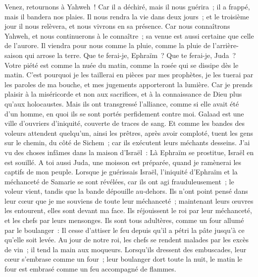\begin{multicols}{2}
\VerseOne{}Venez, retournons à Yahweh~! Car il a déchiré, mais il nous guérira~; il a frappé, mais il bandera nos plaies.
Il nous rendra la vie dans deux jours~; et le troisième jour il nous relèvera, et nous vivrons en sa présence.
Car nous connaîtrons Yahweh, et nous continuerons à le connaître~; sa venue est aussi certaine que celle de l'aurore. Il viendra pour nous comme la pluie, comme la pluie de l'arrière-saison qui arrose la terre.
Que te ferai-je, Ephraïm~? Que te ferai-je, Juda~? Votre piété est comme la nuée du matin, comme la rosée qui se dissipe dès le matin.
C'est pourquoi je les taillerai en pièces par mes prophètes, je les tuerai par les paroles de ma bouche, et mes jugements apporteront la lumière.
Car je prends plaisir à la miséricorde et non aux sacrifices, et à la connaissance de Dieu plus qu'aux holocaustes.
Mais ils ont transgressé l'alliance, comme si elle avait été d'un homme, en quoi ils se sont portés perfidement contre moi.
Galaad est une ville d'ouvriers d'iniquité, couverte de traces de sang.
Et comme les bandes des voleurs attendent quelqu'un, ainsi les prêtres, après avoir comploté, tuent les gens sur le chemin, du côté de Sichem~; car ils exécutent leurs méchants desseins.
J'ai vu des choses infâmes dans la maison d'Israël~: Là Ephraïm se prostitue, Israël en est souillé.
A toi aussi Juda, une moisson est préparée, quand je ramènerai les captifs de mon peuple.
\VerseOne{}Lorsque je guérissais Israël, l'iniquité d'Ephraïm et la méchanceté de Samarie se sont révélées, car ils ont agi frauduleusement~; le voleur vient, tandis que la bande dépouille au-dehors.
Ils n'ont point pensé dans leur cœur que je me souviens de toute leur méchanceté~; maintenant leurs œuvres les entourent, elles sont devant ma face.
Ils réjouissent le roi par leur méchanceté, et les chefs par leurs mensonges.
Ils sont tous adultères, comme un four allumé par le boulanger~: Il cesse d'attiser le feu depuis qu'il a pétri la pâte jusqu'à ce qu'elle soit levée.
Au jour de notre roi, les chefs se rendent malades par les excès de vin~; il tend la main aux moqueurs.
Lorsqu'ils dressent des embuscades, leur cœur s'embrase comme un four~; leur boulanger dort toute la nuit, le matin le four est embrasé comme un feu accompagné de flammes.

\end{multicols}

